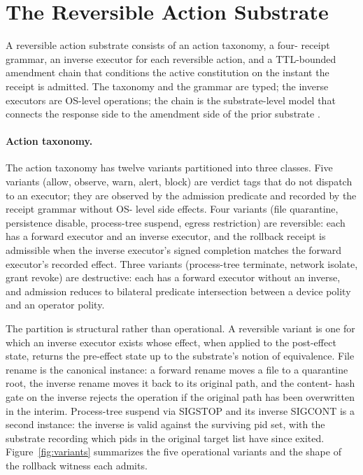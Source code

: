 \section{The Reversible Action Substrate}
\label{sec:substrate-ra}

A reversible action substrate consists of an action taxonomy, a four-
receipt grammar, an inverse executor for each reversible action, and a
TTL-bounded amendment chain that conditions the active constitution on
the instant the receipt is admitted. The taxonomy and the grammar are
typed; the inverse executors are OS-level operations; the chain is the
substrate-level model that connects the response side to the amendment
side of the prior substrate
\cite{programmableSovereigntyAnonymous}.

\paragraph{Action taxonomy.}
The action taxonomy has twelve variants partitioned into three classes.
Five variants (allow, observe, warn, alert, block) are verdict tags
that do not dispatch to an executor; they are observed by the
admission predicate and recorded by the receipt grammar without OS-
level side effects. Four variants (file quarantine, persistence
disable, process-tree suspend, egress restriction) are reversible:
each has a forward executor and an inverse executor, and the rollback
receipt is admissible when the inverse executor's signed completion
matches the forward executor's recorded effect. Three variants
(process-tree terminate, network isolate, grant revoke) are
destructive: each has a forward executor without an inverse, and
admission reduces to bilateral predicate intersection between a device
polity and an operator polity.

The partition is structural rather than operational. A reversible
variant is one for which an inverse executor exists whose effect, when
applied to the post-effect state, returns the pre-effect state up to
the substrate's notion of equivalence. File rename is the canonical
instance: a forward rename moves a file to a quarantine root, the
inverse rename moves it back to its original path, and the content-
hash gate on the inverse rejects the operation if the original path
has been overwritten in the interim. Process-tree suspend via SIGSTOP
and its inverse SIGCONT is a second instance: the inverse is valid
against the surviving pid set, with the substrate recording which pids
in the original target list have since exited.
Figure~\ref{fig:variants} summarizes the five operational variants and
the shape of the rollback witness each admits.

